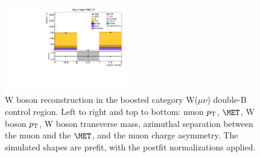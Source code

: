 \begin{figure}[tbp]
\begin{center}
    \includegraphics[width=0.48\textwidth]{figures/wlnhbb2016/boosted/WmnWHTT2bFJCR_lepton1Charge.pdf}
    \caption{W boson reconstruction in the boosted category W($\mu\nu$) double-B control region.
    Left to right and top to bottom: muon $p_{\mathrm{T}}$, $\MET$, W boson $p_{\mathrm{T}}$, W boson transverse mass,
    azimuthal separation between the muon and the $\MET$, and the muon charge asymmetry.
    The simulated shapes are prefit, with the postfit normalizations applied.}
    \label{fig:boost_WmnTT2b_WBosons}
  \end{center}
\end{figure}
\clearpage

